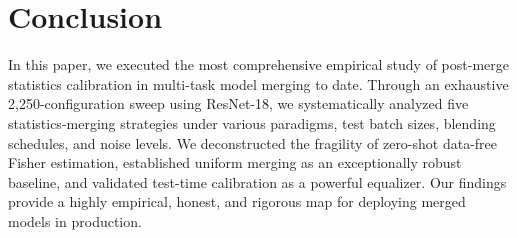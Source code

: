 \documentclass{article}
\theoremstyle{plain}
\theoremstyle{definition}
\theoremstyle{remark}
\begin{document}
\section{Conclusion}
In this paper, we executed the most comprehensive empirical study of post-merge statistics calibration in multi-task model merging to date. Through an exhaustive 2,250-configuration sweep using ResNet-18, we systematically analyzed five statistics-merging strategies under various paradigms, test batch sizes, blending schedules, and noise levels. We deconstructed the fragility of zero-shot data-free Fisher estimation, established uniform merging as an exceptionally robust baseline, and validated test-time calibration as a powerful equalizer. Our findings provide a highly empirical, honest, and rigorous map for deploying merged models in production.



\end{document}
